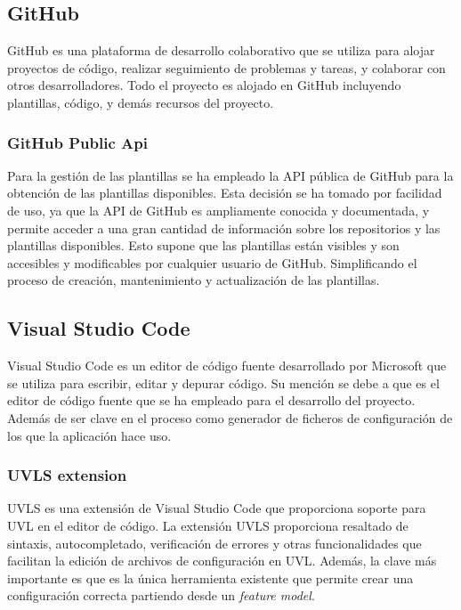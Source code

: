 \documentclass[12pt, a4paper, twoside]{article}
\begin{document}
\subsection{GitHub}
\cite{github}
GitHub es una plataforma de desarrollo colaborativo que se utiliza para alojar proyectos de código, realizar seguimiento de problemas y tareas, y colaborar con otros desarrolladores.
Todo el proyecto es alojado en GitHub incluyendo plantillas, código, y demás recursos del proyecto.
\subsubsection{GitHub Public Api}
\cite{github_rest_api}
Para la gestión de las plantillas se ha empleado la API pública de GitHub para la obtención de las plantillas disponibles.
Esta decisión se ha tomado por facilidad de uso, ya que la API de GitHub es ampliamente conocida y documentada, y permite acceder a una gran cantidad de información sobre los repositorios y las plantillas disponibles.
Esto supone que las plantillas están visibles y son accesibles y modificables por cualquier usuario de GitHub.
Simplificando el proceso de creación, mantenimiento y actualización de las plantillas. 

\newpage

\subsection{Visual Studio Code}
\cite{vscode}
Visual Studio Code es un editor de código fuente desarrollado por Microsoft que se utiliza para escribir, editar y depurar código.
Su mención se debe a que es el editor de código fuente que se ha empleado para el desarrollo del proyecto. Además de ser clave en el proceso como generador de ficheros de configuración
de los que la aplicación hace uso.
\subsubsection{UVLS extension}
UVLS\cite{uvls_code} es una extensión de Visual Studio Code que proporciona soporte para UVL en el editor de código.
La extensión UVLS proporciona resaltado de sintaxis, autocompletado, verificación de errores y otras funcionalidades que facilitan la edición de archivos de configuración en UVL.
Además, la clave más importante es que es la única herramienta existente que permite crear una configuración correcta partiendo desde un \emph{feature model}.
\end{document}
